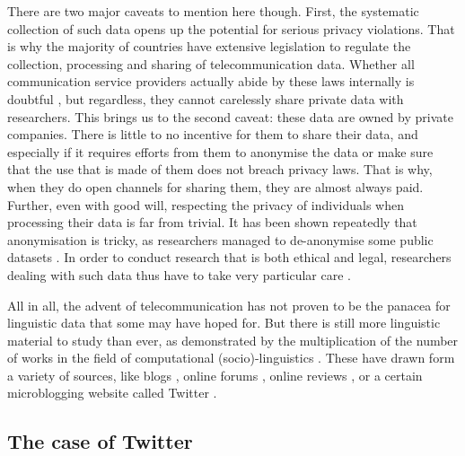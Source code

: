 \documentclass[../thesis.tex]{subfiles}
\begin{document}
There are two major caveats to mention here though. First, the systematic collection of
such data opens up the potential for serious privacy violations. That is why the
majority of countries have extensive legislation to regulate the collection, processing
and sharing of telecommunication data. Whether all communication service providers
actually abide by these laws internally is doubtful
\cite{GDPREnforcement,GDPRFines2023}, but regardless, they cannot carelessly share
private data with researchers. This brings us to the second caveat: these data are owned
by private companies. There is little to no incentive for them to share their data, and
especially if it requires efforts from them to anonymise the data or make sure that the
use that is made of them does not breach privacy laws. That is why, when they do open
channels for sharing them, they are almost always paid. Further, even with good will,
respecting the privacy of individuals when processing their data is far from trivial. It
has been shown repeatedly that anonymisation is tricky, as researchers managed
to de-anonymise some public datasets
\cite{NarayananRobustDeanonymization2008,GambsDeanonymizationAttack2014}. In order to
conduct research that is both ethical and legal, researchers dealing with such data thus
have to take very particular care \cite{OhmBrokenPromises2009,KulkBraveNew2012}.

All in all, the advent of telecommunication has not proven to be the panacea for
linguistic data that some may have hoped for. But there is still more linguistic
material to study than ever, as demonstrated by the multiplication of the number of
works in the field of computational (socio)-linguistics
\cite{NguyenComputationalSociolinguistics2016}. These have drawn form a variety of
sources, like blogs \cite{NguyenAuthorAge2011,SchlerEffectsAge2006}, online forums
\cite{BaruaWhatAre2014,GarleyBeefmovesDissemination2012,NguyenAuthorAge2011}, online
reviews
\cite{HovyUserReview2015,Danescu-Niculescu-MizilNoCountry2013,OtterbacherInferringGender2010},
or a certain microblogging website called Twitter \cite{MocanuTwitterBabel2013,AlshaabiStorywranglerMassive2021,CodyClimateChange2015,AlZamalHomophilyLatent2012,LiaoLifetimeLexical2014}.


\subsection{The case of Twitter}
\label{sec:methods_twitter}
\end{document}

